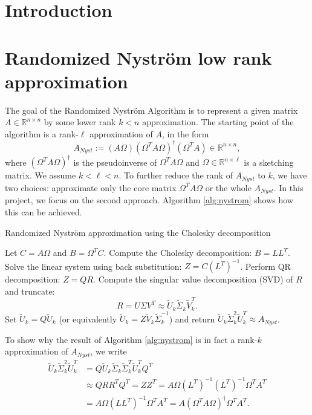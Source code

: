 \documentclass[a4paper, 12pt,oneside]{article}
\begin{document}
 
	 
	\clearpage
	\tableofcontents
	\thispagestyle{empty}
	\clearpage
	\setcounter{page}{1}

	\section{Introduction}
		\lipsum[1]
	\section{Randomized Nyström low rank approximation}
	The goal of the Randomized Nystr\"om Algorithm is to represent a given matrix $A \in \mathbb{R}^{n \times n}$ by some lower rank $k<n$ approximation. The starting point of the algorithm is a rank-$\ell$ approximation of $A$, in the form
	\[
	A_{Nyst} := (A\Omega)(\Omega^T A \Omega)^{\dagger}(\Omega^T A) \in \mathbb{R}^{n \times n},
	\]
	where $(\Omega^T A \Omega)^\dagger$ is the pseudoinverse of $\Omega^T A \Omega$ and $\Omega \in \mathbb{R}^{n \times \ell}$ is a sketching matrix. We assume $k < \ell < n$. To further reduce the rank of $A_{Nyst}$ to $k$, we have two choices: approximate only the core matrix $\Omega^T A \Omega$ or the whole $A_{Nyst}$. In this project, we focus on the second approach. Algorithm \ref{alg:nystrom} shows how this can be achieved.

\begin{algorithm}
\caption{Randomized Nystr\"om approximation using the Cholesky decomposition}
\label{alg:nystrom}
\begin{algorithmic}[1]
  \State Let $C = A\Omega$ and $B = \Omega^T C$.
  \State Compute the Cholesky decomposition: $B = LL^T$.
  \State Solve the linear system using back substitution: $Z = C(L^T)^{-1}$.
  \State Perform QR decomposition: $Z = QR$.
  \State Compute the singular value decomposition (SVD) of $R$ and truncate:
  \[ R = U \Sigma V^T \approx \tilde{U}_k \tilde{\Sigma}_k \tilde{V}_k^T. \]
  \State Set $\tilde{U}_k = Q\tilde{U}_k$ (or equivalently $\tilde{U}_k = Z\tilde{V}_k\tilde{\Sigma}_k^{-1}$) and return $\tilde{U}_k \tilde{\Sigma}_k^2 \tilde{U}_k^T \approx A_{Nyst}$.
\end{algorithmic}
\end{algorithm}

To show why the result of Algorithm \ref{alg:nystrom} is in fact a rank-$k$ approximation of $A_{Nyst}$, we write
\begin{align*}
\tilde{U}_k \tilde{\Sigma}_k^2 \tilde{U}_k^T &= Q\tilde{U}_k \tilde{\Sigma}_k \tilde{\Sigma}_k^T \tilde{U}_k^T Q^T \\
&\approx QRR^T Q^T = ZZ^T = A\Omega(L^T)^{-1}(L^T)^{-1}\Omega^T A^T \\
&= A\Omega(LL^T)^{-1}\Omega^T A^T = A(\Omega^T A \Omega)^{\dagger}\Omega^T A^T.
\end{align*}
\end{document}
